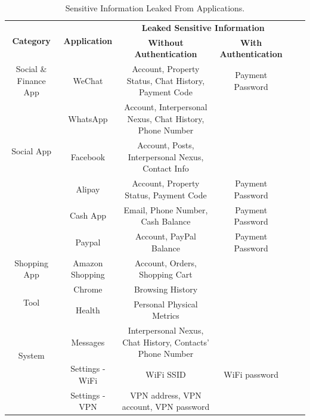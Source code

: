 \begin{table}[t]
	\centering
	\begin{tabular}{|c|c|c|c|c|c|}
		\hline
		\multirow{2}{*}{\textbf{Category} } & \multirow{2}{*}{ \textbf{Application} } & \multicolumn{2}{c|}{\textbf{Leaked Sensitive Information}} \\
															\cline{3-4}
											&				& \textbf{Without Authentication}						& \textbf{With Authentication} \\
		\hline
		Social \& Finance App 				& WeChat      & Account, Property Status, Chat History, Payment Code   		& Payment Password \\
		\hline
		\multirow{3}{*}{Social App}
							       			& WhatsApp    & Account, Interpersonal Nexus, Chat History, Phone Number    & \\
											\cline{2-4}
							       			& Facebook    & Account, Posts, Interpersonal Nexus, Contact Info           & \\
		\hline
		\multirow{3}{*}{Finance App}       	& Alipay      & Account, Property Status, Payment Code         				& Payment Password \\
											\cline{2-4}
											& Cash App    & Email, Phone Number, Cash Balance							& Payment Password \\
											\cline{2-4}
											& Paypal      & Account, PayPal Balance     								& Payment Password \\
		\hline
		\multirow{1}{*}{Shopping App}		& Amazon Shopping  & Account, Orders, Shopping Cart         				& \\
		\hline
		\multirow{2}{*}{Tool}               & Chrome      & Browsing History                                	& \\
											\cline{2-4}
		                					& Health      & Personal Physical Metrics      						& \\
		\hline
		\multirow{2}{*}{System}             &  Messages   & Interpersonal Nexus, Chat History, Contacts' Phone Number &   \\
											\cline{2-4}
											& Settings - WiFi   & WiFi SSID                                	&  WiFi password \\
											\cline{2-4}
		                					& Settings - VPN    & VPN address, VPN account, VPN password      						& \\
		\hline
	\end{tabular}
	\linebreak
	\caption{Sensitive Information Leaked From Applications.}
	\label{table:information_extracted}
\end{table}



